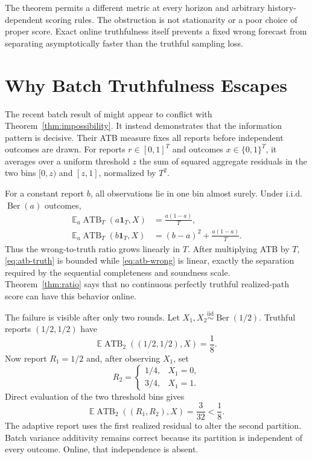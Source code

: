\documentclass[twoside]{article}
\newcommand{\E}{\mathbb E}
\newcommand{\1}{\mathbf 1}
\begin{document}
The theorem permits a different metric at every horizon and arbitrary history-dependent scoring rules. The obstruction is not stationarity or a poor choice of proper score. Exact online truthfulness itself prevents a fixed wrong forecast from separating asymptotically faster than the truthful sampling loss.

\section{Why Batch Truthfulness Escapes}
\label{sec:batch}

The recent batch result of \citet{hartline2026perfect} might appear to conflict with Theorem~\ref{thm:impossibility}. It instead demonstrates that the information pattern is decisive. Their ATB measure fixes all reports before independent outcomes are drawn. For reports $r\in[0,1]^T$ and outcomes $x\in\{0,1\}^T$, it averages over a uniform threshold $z$ the sum of squared aggregate residuals in the two bins $[0,z)$ and $[z,1]$, normalized by $T^2$.

For a constant report $b$, all observations lie in one bin almost surely. Under i.i.d. $\operatorname{Ber}(a)$ outcomes,
\begin{align}
 \E_a\operatorname{ATB}_T(a\1_T,X)
 &=\frac{a(1-a)}{T},\label{eq:atb-truth}\\
 \E_a\operatorname{ATB}_T(b\1_T,X)
 &=(b-a)^2+\frac{a(1-a)}{T}.
 \label{eq:atb-wrong}
\end{align}
Thus the wrong-to-truth ratio grows linearly in $T$. After multiplying ATB by $T$, \eqref{eq:atb-truth} is bounded while \eqref{eq:atb-wrong} is linear, exactly the separation required by the sequential completeness and soundness scale. Theorem~\ref{thm:ratio} says that no continuous perfectly truthful realized-path score can have this behavior online.

The failure is visible after only two rounds. Let $X_1,X_2\stackrel{\mathrm{iid}}\sim\operatorname{Ber}(1/2)$. Truthful reports $(1/2,1/2)$ have
\begin{equation*}
 \E\operatorname{ATB}_2((1/2,1/2),X)=\frac18.
\end{equation*}
Now report $R_1=1/2$ and, after observing $X_1$, set
\begin{equation*}
 R_2=\begin{cases}1/4,&X_1=0,\\3/4,&X_1=1.\end{cases}
\end{equation*}
Direct evaluation of the two threshold bins gives
\begin{equation*}
 \E\operatorname{ATB}_2((R_1,R_2),X)=\frac{3}{32}<\frac18.
\end{equation*}
The adaptive report uses the first realized residual to alter the second partition. Batch variance additivity remains correct because its partition is independent of every outcome. Online, that independence is absent.
\end{document}
